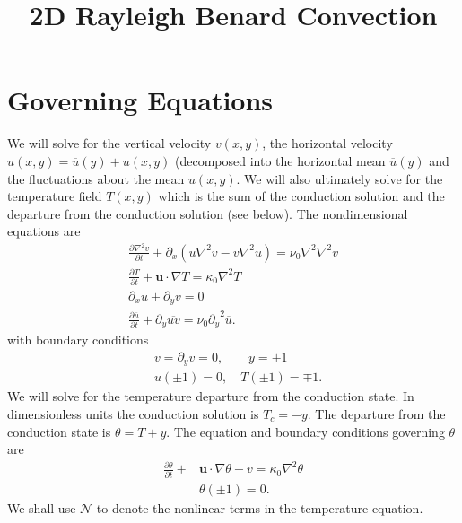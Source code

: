 \documentclass[12pt]{article}
\title{2D Rayleigh Benard Convection}
\newcommand{\lapl}{\nabla^{2}}
\newcommand{\lr}[1]{\left(#1\right)}
\newcommand{\ua}{\overline{u}}
\begin{document}
  \maketitle

  \section{Governing Equations}
    We will solve for the vertical velocity $v\lr{x,y}$, the horizontal velocity $u\lr{x,y} = \ua\lr{y} + u\lr{x,y}$ 
    (decomposed into the horizontal mean $\ua\lr{y}$ and the fluctuations about the mean $u\lr{x,y}$.  We will 
    also ultimately solve for the temperature field $T\lr{x,y}$ which is the sum of the conduction solution and 
    the departure from the conduction solution (see below).  The nondimensional equations are 
    \begin{align}
      \frac{\partial \lapl v}{\partial t} + \partial_{x}\lr{u\lapl v - v\lapl u} = \nu_{0}\lapl\lapl v \\
      \frac{\partial T}{\partial t} + \mathbf{u}\cdot\nabla T = \kappa_{0}\lapl T \\
      \partial_{x}u + \partial_{y}v = 0 \\
      \frac{\partial \ua}{\partial t} + \partial_{y} \overline{uv} = \nu_{0} {\partial_{y}}^{2}  \ua \label{eq:meanflow}.
    \end{align}
    with boundary conditions 
    \begin{align}
      &v = \partial_{y} v = 0, \qquad y = \pm 1 \\
      &u\lr{\pm 1} = 0, \quad T\lr{\pm 1} = \mp 1.
    \end{align}
    We will solve for the temperature departure from the conduction state.  In dimensionless units 
    the conduction solution is $T_{c} = -y$.  The departure from the conduction state is 
    $\theta = T + y$.  The equation and boundary conditions governing $\theta$ are 
    \begin{align}
      \frac{\partial \theta}{\partial t} + &\mathbf{u}\cdot\nabla\theta - v = \kappa_{0}\lapl\theta \\
      &\theta\lr{\pm 1} = 0.
    \end{align}
    We shall use $\mathcal{N}$ to denote the nonlinear terms in the temperature equation.
\end{document}
